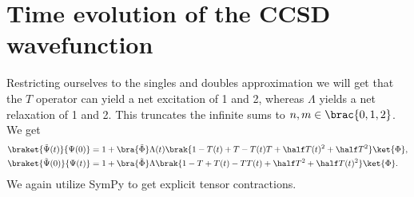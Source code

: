     \section{Time evolution of the CCSD wavefunction}
        Restricting ourselves to the singles and doubles approximation we will
        get that the $T$ operator can yield a net excitation of 1 and 2, whereas
        $\Lambda$ yields a net relaxation of 1 and 2. This truncates the
        infinite sums to $n, m \in \brac{0, 1, 2}$. We get
        \begin{align}
            \braket{\tilde{\Psi}(t)}{\Psi(0)}
            &= 1
            + \bra{\tilde{\Phi}}\Lambda(t)\brak{
                1 - T(t) + T - T(t)T
                + \half T(t)^2 + \half T^2
            }\ket{\Phi},
            \\
            \braket{\tilde{\Psi}(0)}{\Psi(t)}
            &= 1
            + \bra{\tilde{\Phi}}\Lambda\brak{
                1 - T + T(t) - TT(t)
                + \half T^2 + \half T(t)^2
            }\ket{\Phi}.
        \end{align}
        We again utilize SymPy\cite{sympy} to get explicit tensor contractions.
